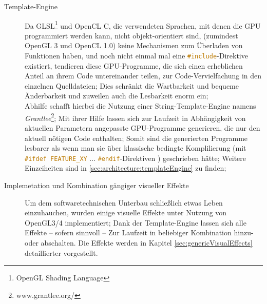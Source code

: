 \begin{description}
	
	\item[Template-Engine]
	Da GLSL\footnote{OpenGL Shading Language} und OpenCL C, die verwendeten Sprachen, 
	mit denen die GPU programmiert werden kann, nicht objekt-orientiert sind, 
	(zumindest OpenGL 3 und OpenCL 1.0) keine Mechanismen zum Überladen von Funktionen 
	haben, und noch nicht einmal mal eine \linebreak \lstinline[language=C]|#include|-Direktive existiert,
	tendieren diese GPU-Programme, die sich einen erheblichen Anteil an ihrem Code untereinander teilen, 
	zur Code-Vervielfachung in den einzelnen Quelldateien;
	Dies schränkt die Wartbarkeit und bequeme Änderbarkeit und zuweilen auch die Lesbarkeit enorm ein;\\
	Abhilfe schafft hierbei die Nutzung einer String-Template-Engine namens \emph{Grantlee}\footnote{www.grantlee.org/};
	Mit ihrer Hilfe lassen sich zur Laufzeit in Abhängigkeit von aktuellen Parametern angepasste GPU-Programme generieren,
	die nur den aktuell nötigen Code enthalten;
	Somit sind die generierten Programme lesbarer als wenn man sie über klassische bedingte Komplilierung 
	(mit \lstinline[language=C]|#ifdef FEATURE_XY| ... \lstinline[language=C]|#endif|-Direktiven ) geschrieben hätte;
	Weitere Einzeiheiten sind in \ref{sec:architecture:templateEngine} zu finden;

	
	\item[Implemetation und Kombination gängiger visueller Effekte]
	Um dem softwaretechnischen Unterbau schließlich etwas Leben einzuhauchen, wurden einige visuelle Effekte unter
	Nutzung von OpenGL3/4 implementiert; Dank der Template-Engine lassen sich alle Effekte -- sofern sinnvoll --
	Zur Laufzeit in beliebiger Kombination hinzu- oder abschalten.
	Die Effekte werden in Kapitel \ref{sec:genericVisualEffects} detaillierter vorgestellt.
	


\end{description}
